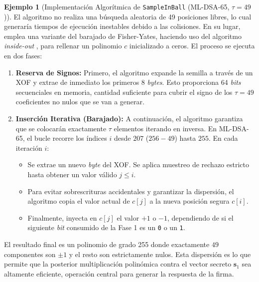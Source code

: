 \documentclass[11pt, a4paper]{report}
\theoremstyle{definition}
\newtheorem{ejemplo}{Ejemplo}[chapter]
\begin{document}
\vspace{0.5cm}
\begin{ejemplo}[Implementación Algorítmica de \texttt{SampleInBall} (ML-DSA-65, $\tau = 49$)]
\label{ex:sample_in_ball}
El algoritmo no realiza una búsqueda aleatoria de 49 posiciones libres, lo cual generaría tiempos de ejecución inestables debido a las colisiones. En su lugar, emplea una variante del barajado de Fisher-Yates, haciendo uso del algoritmo \textit{inside-out} \cite{durstenfeld1964algorithm}, para rellenar un polinomio $c$ inicializado a ceros. El proceso se ejecuta en dos fases:

\begin{enumerate}
    \item \textbf{Reserva de Signos:} Primero, el algoritmo expande la semilla a través de un XOF y extrae de inmediato los primeros 8 \textit{bytes}. Esto proporciona 64 \textit{bits} secuenciales en memoria, cantidad suficiente para cubrir el signo de los $\tau = 49$ coeficientes no nulos que se van a generar.
    
    \item \textbf{Inserción Iterativa (Barajado):} A continuación, el algoritmo garantiza que se colocarán exactamente $\tau$ elementos iterando en inversa. En ML-DSA-65, el bucle recorre los índices $i$ desde $207$ ($256 - 49$) hasta $255$. En cada iteración $i$:
    \begin{itemize}
        \item Se extrae un nuevo \textit{byte} del XOF. Se aplica muestreo de rechazo estricto hasta obtener un valor válido $j \le i$.
        \item Para evitar sobrescrituras accidentales y garantizar la dispersión, el algoritmo copia el valor actual de $c[j]$ a la nueva posición segura $c[i]$.
        \item Finalmente, inyecta en $c[j]$ el valor $+1$ o $-1$, dependiendo de si el siguiente \textit{bit} consumido de la Fase 1 es un \texttt{0} o un \texttt{1}.
    \end{itemize}
\end{enumerate}

El resultado final es un polinomio de grado 255 donde exactamente $49$ componentes son $\pm 1$ y el resto son estrictamente nulos. Esta dispersión es lo que permite que la posterior multiplicación polinómica contra el vector secreto $\mathbf{s}_1$ sea altamente eficiente, operación central para generar la respuesta de la firma.
\end{ejemplo}
\end{document}
